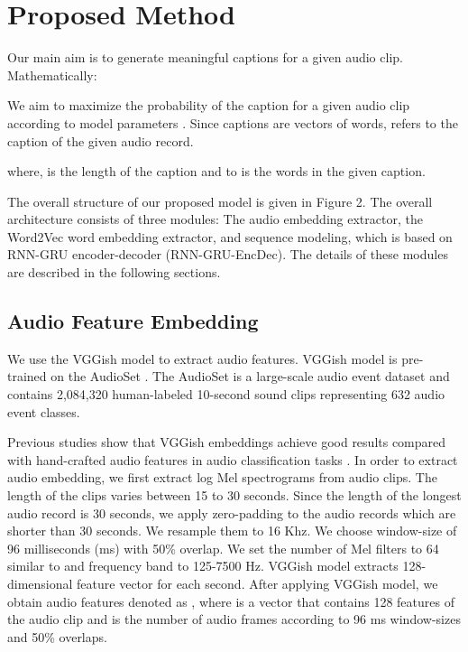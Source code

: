 \documentclass{article}
\begin{document}
\section{Proposed Method}

Our main aim is to generate meaningful captions for a given audio clip. Mathematically: 
 

We aim to maximize the probability of the caption  for a given audio clip  according to model parameters . Since captions are vectors of words,  refers to the caption of the given audio record.

 

where,  is the length of the caption and  to  is the words in the given caption.

The overall structure of our proposed model is given in Figure 2. The overall architecture consists of three modules: The audio embedding extractor, the Word2Vec word embedding extractor, and sequence modeling, which is based on RNN-GRU encoder-decoder (RNN-GRU-EncDec). The details of these modules are described in the following sections.


\subsection{Audio Feature Embedding}
We use the VGGish model to extract audio features. VGGish model is pre-trained on the AudioSet \cite{7952261}. The AudioSet is a large-scale audio event dataset and contains 2,084,320 human-labeled 10-second sound clips representing 632 audio event classes.

Previous studies show that VGGish embeddings achieve good results compared with hand-crafted audio features in audio classification tasks \cite{DBLP:journals/corr/abs-1905-01926,Basbug2019}. In order to extract audio embedding, we first extract log Mel spectrograms from audio clips. The length of the clips varies between 15 to 30 seconds. Since the length of the longest audio record is 30 seconds, we apply zero-padding to the audio records which are shorter than 30 seconds. We resample them to 16 Khz. We choose window-size of 96 milliseconds (ms) with 50\% overlap. We set the number of Mel filters to 64 similar to \cite{Drossos_2020} and frequency band to 125-7500 Hz. VGGish model extracts 128-dimensional feature vector for each second. After applying VGGish model, we obtain audio features denoted as  , where  is a vector that contains 128 features of the audio clip and  is the number of audio frames according to 96 ms window-sizes and 50\% overlaps.
\end{document}
